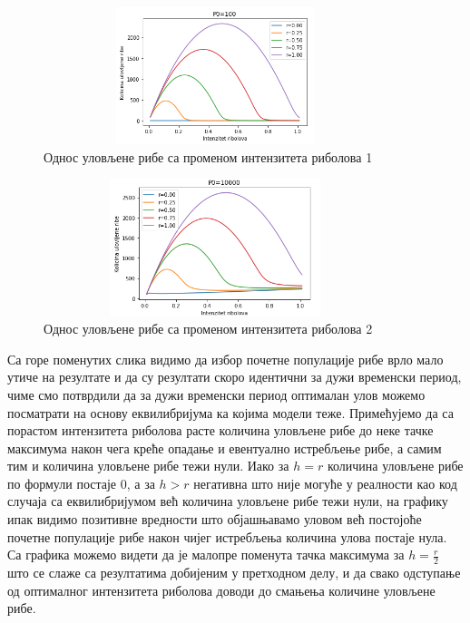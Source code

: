 \documentclass[a4paper]{article}
\begin{document}
{\begin{figure}[h!]
	\centering
	\includegraphics[width=10cm,height=4.0cm]{images/IntenzityChangeP100.png}
	\caption{Однос уловљене рибе са променом интензитета риболова 1}
	\label{intensityincrease1}
\end{figure}
 
 \begin{figure}[h!]
	\centering
	\includegraphics[width=10cm,height=4.0cm]{images/IntenzityChangeP10000.png}
	\caption{Однос уловљене рибе са променом интензитета риболова 2}
	\label{intensityincrease2}
\end{figure}

Са горе поменутих слика видимо да избор почетне популације рибе врло мало утиче на резултате и да су резултати скоро идентични за дужи временски период, чиме смо потврдили да за дужи временски период оптималан улов можемо посматрати на основу еквилибријума ка којима модели теже. Примећујемо да са порастом интензитета риболова расте количина уловљене рибе до неке тачке максимума након чега креће опадање и евентуално истребљење рибе, а самим тим и количина уловљене рибе тежи нули. Иако за $h = r$ количина уловљене рибе по формули \label{maxyeald} постаје 0, а за $h > r$ негативна што није могуће у реалности као код случаја са еквилибријумом већ количина уловљене рибе тежи нули, на графику ипак видимо позитивне вредности што објашњавамо уловом већ постојоће почетне популације рибе након чијег истребљења количина улова постаје нула. Са графика можемо видети да је малопре поменута тачка максимума за $h=\frac{r}{2}$ што се слаже са резултатима добијеним у претходном делу, и да свако одступање од оптималног интензитета риболова доводи до смањења количине уловљене рибе.

}
\end{document}
